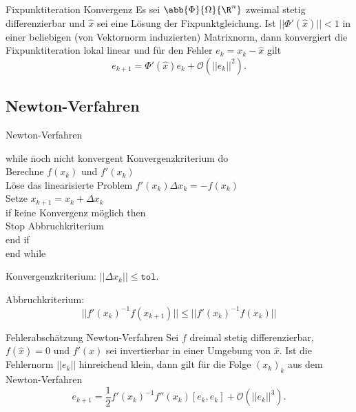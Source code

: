 \begin{karte}{Fixpunktiteration Konvergenz}
    Es sei \( \abb{\Phi}{\Omega}{\R^n} \) zweimal stetig differenzierbar und 
    \( \widehat{x} \) sei eine Lösung der Fixpunktgleichung. Ist 
    \( ||\Phi'(\widehat{x})|| < 1 \) in einer beliebigen (von Vektornorm induzierten) Matrixnorm, 
    dann konvergiert die Fixpunktiteration lokal linear und für den Fehler 
    \( e_k = x_k - \widehat{x} \) gilt 
    \[ e_{k+1} = \Phi'(\widehat{x}) e_k + \mathcal{O}(||e_k||^2). \]
\end{karte}

\subsection{Newton-Verfahren}

\begin{karte}{Newton-Verfahren}
    \begin{tabbing}
        while \= noch nicht konvergent {Konvergenzkriterium} do \\
        \> Berechne \( f(x_k) \) und \( f'(x_k) \) \\
        \> Löse das linearisierte Problem \( f'(x_k) \Delta x_k = -f(x_k) \) \\
        \> Setze \( x_{k+1} = x_k + \Delta x_k \) \\
        \> if \= keine Konvergenz möglich then \\
        \> \> Stop {Abbruchkriterium} \\
        \> end if \\
        end while
    \end{tabbing}

    Konvergenzkriterium: \( ||\Delta x_k || \leq \texttt{tol} \).

    Abbruchkriterium: 
    \[ ||f'(x_k)^{-1} f(x_{k+1}) || \leq ||f'(x_k)^{-1} f(x_k)|| \]
\end{karte}

\begin{karte}{Fehlerabschätzung Newton-Verfahren}
    Sei \(f \) dreimal stetig differenzierbar, \( f(\widehat{x}) = 0 \) 
    und \(f'(x)\) sei invertierbar in einer Umgebung von \(\widehat{x}\). 
    Ist die Fehlernorm \(||e_k||\) hinreichend klein, dann gilt für die Folge 
    \( (x_k)_k \) aus dem Newton-Verfahren 
    \[ e_{k+1} = \frac{1}{2} f'(x_k)^{-1} f''(x_k)[e_k, e_k] + \mathcal{O}(||e_k||^3). \]
\end{karte}

